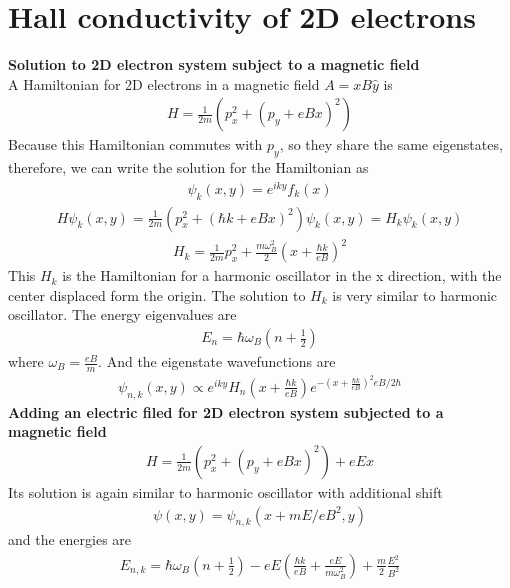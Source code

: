 \documentclass[a4paper]{article}
\begin{document}
\section{Hall conductivity of 2D electrons }
{\bf Solution to 2D electron system subject to a magnetic field}\\
A Hamiltonian for 2D electrons in a magnetic field $A = xB\hat y$ is\\
\begin{align*}
	H = \frac{1}{2m} (p_x^2 + (p_y + eBx)^2)
\end{align*}
Because this Hamiltonian commutes with $p_y$, so they share the same eigenstates, therefore, we can write the
solution for the Hamiltonian as
\begin{align*}
	\psi_k(x, y) = e^{iky}f_k(x)
\end{align*}
\begin{align*}
	H \psi_k(x, y) = \frac{1}{2m} (p_x^2 +(\hbar k + eBx)^2) \psi_k(x, y) = H_k \psi_k(x, y)
\end{align*}
\begin{align*}
		H_k = \frac{1}{2m} p_x^2 +\frac{m \omega_B^2}{2} (x+ \frac{\hbar k}{eB})^2
\end{align*}
This $H_k$ is the Hamiltonian for a harmonic oscillator in the x direction, with the center displaced form the origin. The solution to $H_k$ is very similar to harmonic oscillator. The energy eigenvalues are
\begin{align*}
	E_n = \hbar \omega_B (n + \frac{1}{2})
\end{align*}
where $\omega_B = \frac{eB}{m}$. And the eigenstate wavefunctions are
\begin{align*}
	\psi_{n,k}(x, y) \propto e^{iky} H_n(x + \frac{\hbar k}{eB})e^{-(x+ \frac{\hbar k}{eB})^2eB/2\hbar}
\end{align*}
{\bf Adding an electric filed for 2D electron system subjected to a magnetic field}\\
\begin{align*}
	H = \frac{1}{2m} (p_x^2 + (p_y + eBx)^2) + eEx
\end{align*}
Its solution is again similar to harmonic oscillator with additional shift
\begin{align*}
	\psi(x, y) = \psi_{n,k}(x+ mE/eB^2, y)	
\end{align*}
and the energies are 
\begin{align*}
	E_{n,k} = \hbar \omega_B (n+ \frac{1}{2}) -eE(\frac{\hbar k}{eB}+\frac{eE}{m\omega_B^2})+\frac{m}{2}\frac{E^2}{B^2}
\end{align*}
\end{document}
